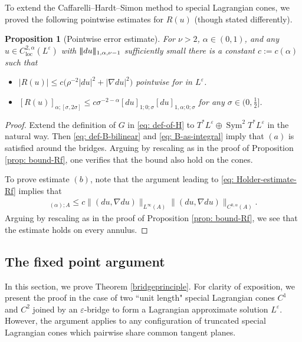 \documentclass[11pt]{amsart}
\DeclarePairedDelimiter{\tnorm}{\vert\!\vert\!\vert}{\vert\!\vert\!\vert}
\newtheorem{proposition}{Proposition}
\theoremstyle{definition}
\theoremstyle{remark}
\begin{document}
To extend the Caffarelli--Hardt--Simon method to special Lagrangian cones, we proved the following pointwise estimates for $R(u)$ (though stated differently).
\begin{proposition}[Pointwise error estimate]\label{prop: pointerror}
    For $\nu > 2$, $\alpha \in (0,1)$, and any $u \in C_{\text{loc}}^{2,\alpha}(L^\varepsilon)$ with $\tnorm{du}_{1,\alpha,\nu-1}$ sufficiently small there is a constant $c := c(\alpha)$ such that 
    \begin{itemize}
        \item[(a)] $|R(u)| \leq c\big(\rho^{-2}|du|^2 + |\nabla du|^2\big)$ pointwise for in $L^\varepsilon$.
        \item[(b)] $[R(u)]_{\alpha;[\sigma,2\sigma]} \leq c \sigma^{-2-\alpha}[du]_{1;0;\sigma}[du]_{1,\alpha;0;\sigma}$ for any $\sigma\in (0,\frac{1}{2}]$.
    \end{itemize}
\end{proposition}
\begin{proof}
    Extend the definition of $G$ in \eqref{eq: def-of-H} to $T^*L^\varepsilon\oplus \operatorname{Sym}^2T^*L^\varepsilon$ in the natural way. Then \eqref{eq: def-B-bilinear} and \eqref{eq: B-as-integral} imply that $(a)$ is satisfied around the bridges. Arguing by rescaling as in the proof of Proposition \ref{prop: bound-Rf}, one verifies that the bound also hold on the cones.
    
    To prove estimate $(b)$, note that the argument leading to \eqref{eq: Holder-estimate-Rf} implies that
    \begin{align*}
        [R(u)]_{(\alpha); A}\leq c\lVert(du,\nabla du)\rVert_{L^\infty(A)}\lVert(du,\nabla du)\rVert_{C^{0,\alpha}(A)}.
    \end{align*}
    Arguing by rescaling as in the proof of Proposition \ref{prop: bound-Rf}, we see that the estimate holds on every annulus.
\end{proof}
\subsection{The fixed point argument}\label{ssec: fixed-point-argument2}
In this section, we prove Theorem \ref{bridgeprinciple}. For clarity of exposition, we present the proof in the case of two ``unit length" special Lagrangian cones $C^1$ and $C^2$ joined by an 
$\varepsilon$-bridge to form a Lagrangian approximate solution $L^\varepsilon$. However, the argument applies to any configuration of truncated special Lagrangian cones which pairwise share common tangent planes.
\end{document}
